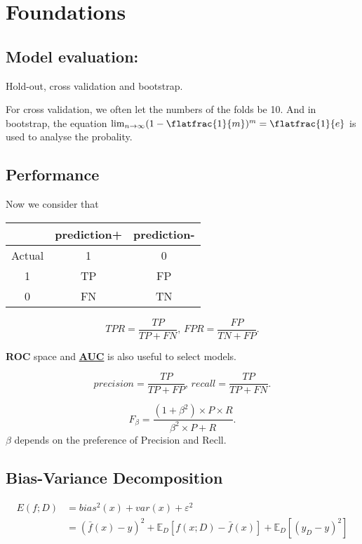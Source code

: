 \section{Foundations}
\subsection{Model evaluation:}
Hold-out, cross validation and bootstrap.

For cross validation, we often let the numbers of the folds be 10. And in bootstrap, the equation $\lim_{n\to\infty}(1-\flatfrac{1}{m})^m=\flatfrac{1}{e}$ is used to analyse the probality.

\subsection{Performance}
\begin{defi}
	Now we consider that
	\begin{table}[H]
		\centering
		\begin{tabular}{c|c|c}
			       & prediction+ & prediction- \\ \hline
			Actual & 1           & 0           \\ \hline
			1      & TP          & FP          \\ \hline
			0      & FN          & TN
		\end{tabular}
	\end{table}
	\[
		TPR=\frac{TP}{TP+FN},\,
		FPR=\frac{FP}{TN+FP}
		.\]
\end{defi}
\begin{remark}
	{\textbf{ROC}} space and \href{https://baike.baidu.com/item/AUC/19282953}{\textbf{AUC}} is also useful to select models.

\end{remark}

\begin{defi}
	\[
		precision=\frac{TP}{TP+FP},\,
		recall=\frac{TP}{TP+FN}
		.\]
\end{defi}


\[
	F_\beta=\frac{(1+\beta^2)\times P\times R}{\beta^2\times P+R}
	.\]
$\beta$ depends on the preference of Precision and Recll.


\subsection{Bias-Variance Decomposition}
\begin{thm}
	\[
		\begin{aligned}
			E(f; D) & =
			bias^2(x)+var(x)+\varepsilon^2
			\\&=
			(\bar{f}(x)-y)^2+\mathbb{E}_D[f(x; D)-\bar{f}(x)]+\mathbb{E}_D[(y_D-y)^2]
		\end{aligned}
	\]

\end{thm}
